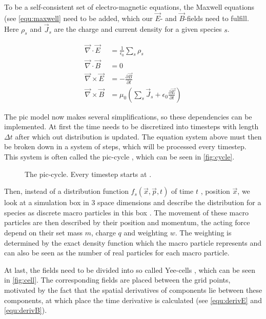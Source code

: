 \documentclass[bachelor_thesis]{subfiles}
\begin{document}
To be a self-consistent set of electro-magnetic equations, the Maxwell equations (see \autoref{equ:maxwell} need to be added, which our $\vec{E}$- and $\vec{B}$-fields need to fulfill. Here $\rho_s$ and $\vec{J}_s$ are the charge and current density for a given species $s$.

\begin{align}
	\vec{\nabla}\cdot\vec{E}  &= \frac{1}{\epsilon_0}\sum_s \rho_s 			\label{equ:maxwell}				\\
	\vec{\nabla}\cdot\vec{B}  &= 0 													\nonumber	\\
	\vec{\nabla}\times\vec{E} &= -\frac{\partial \vec{B}}{\partial t}								\nonumber	\\
	\vec{\nabla}\times\vec{B}&= \mu_0 \left(\sum_s \vec{J}_s + \epsilon_0 \frac{\partial \vec{E}}{\partial t}\right)	\nonumber
\end{align}

The \gls{pic} model now makes several simplifications, so these dependencies can be implemented.
At first the time needs to be discretized into timesteps with length $\Delta t$ after which out distribution is updated. The equation system above must then be broken down in a system of steps, which will be processed every timestep.
This system is often called the \gls{pic}-cycle \cite{Huebl2019}, which can be seen in \autoref{fig:cycle}.

\begin{figure}
	\centering
	\missingfigure{}
	\caption{The \gls{pic}-cycle. Every timestep starts at .}
	\label{fig:cycle}
\end{figure}

Then, instead of a distribution function $f_s(\vec{x}, \vec{p}, t)$ of time $t$ , position $\vec{x}$, we look at a simulation box in 3 space dimensions and describe the distribution for a species as discrete macro particles in this box \cite{Burau2010}.
The movement of these macro particles are then described by their position and momentum, the acting force depend on their set mass $m$, charge $q$ and weighting $w$.
The weighting is determined by the exact density function which the macro particle represents and can also be seen as the number of real particles for each macro particle.


At last, the fields need to be divided into so called Yee-cells \cite{Yee1966}, which can be seen in \autoref{fig:cell}. The corresponding fields are placed between the grid points, motivated by the fact that the spatial derivatives of components lie between these components, 
at which place the time derivative is calculated (see \autoref{equ:derivE} and \autoref{equ:derivB}).
\end{document}
